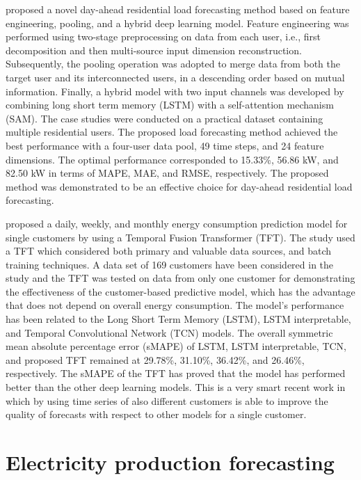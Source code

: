 \cite{ZANG2021120682} proposed a novel day-ahead residential load forecasting method based on feature engineering, pooling, and a hybrid deep learning model.
Feature engineering was performed using two-stage preprocessing on data from each user, i.e., first decomposition and then multi-source input dimension reconstruction.
Subsequently, the pooling operation was adopted to merge data from both the target user and its interconnected users, in a descending order based on mutual information.
Finally, a hybrid model with two input channels was developed by combining long short term memory (LSTM) with a self-attention mechanism (SAM).
The case studies were conducted on a practical dataset containing multiple residential users.
The proposed load forecasting method achieved the best performance with a four-user data pool, 49 time steps, and 24 feature dimensions.
The optimal performance corresponded to 15.33\%, 56.86 kW, and 82.50 kW in terms of MAPE, MAE, and RMSE, respectively.
The proposed method was demonstrated to be an effective choice for day-ahead residential load forecasting.

\cite{NAZIR2023100888} proposed a daily, weekly, and monthly energy consumption prediction model for single customers by using a Temporal Fusion Transformer (TFT).
The study used a TFT which considered both primary and valuable data sources, and batch training techniques.
A data set of 169 customers have been considered in the study and the TFT was tested on data from only one customer for demonstrating the effectiveness of the customer-based predictive model, which has the advantage that does not depend on overall energy consumption.
The model’s performance has been related to the Long Short Term Memory (LSTM), LSTM interpretable, and Temporal Convolutional Network (TCN) models.
The overall symmetric mean absolute percentage error (sMAPE) of LSTM, LSTM interpretable, TCN, and proposed TFT remained at 29.78\%, 31.10\%, 36.42\%, and 26.46\%, respectively.
The sMAPE of the TFT has proved that the model has performed better than the other deep learning models.
This is a very smart recent work in which by using time series of also different customers is able to improve the quality of forecasts with respect to other models for a single customer.


\section{Electricity production forecasting}
\label{sec:productionsoa}
\vspace{0.2 cm}

